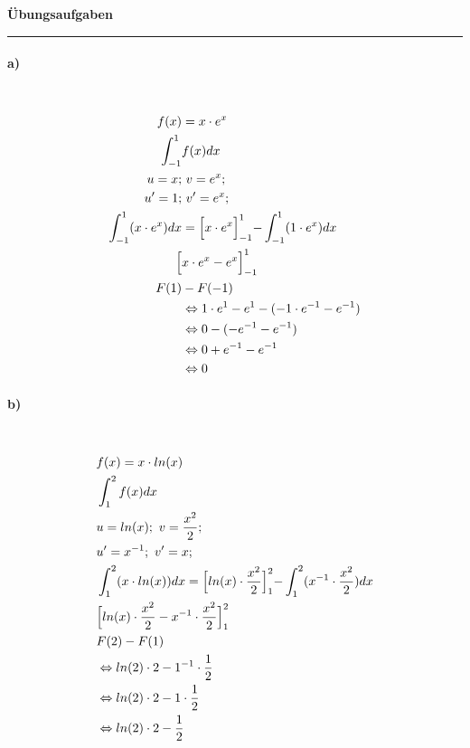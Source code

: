 \documentclass[12pt,a4paper]{report}
\begin{document}
	\noindent
	\Large
	\textbf{Übungsaufgaben}
	\hrule
	\vspace{0.2cm}

	\paragraph{a)} \mbox{} \\
	\begin{align*}
		f(x) &= x \cdot e^x \\
		\int_{-1}^{1}& f(x) dx \\
		u = x;&\ v = e^x; \\
		u' = 1;&\ v' = e^x; \\
		\int_{-1}^{1} (x \cdot e^x) dx &= \Bigl[x \cdot e^x\Bigl]^{1}_{-1}-\int_{-1}^{1} (1 \cdot e^x)dx \\
		\Bigl[&x \cdot e^x - e^x\Bigl]^{1}_{-1} \\
		F(1) &-F(-1) \\
		&\Leftrightarrow 1 \cdot e^1 - e^1 - (-1 \cdot e^{-1} - e^{-1}) \\
		&\Leftrightarrow 0 - (-e^{-1} - e^{-1}) \\
		&\Leftrightarrow 0 + e^{-1} - e^{-1} \\
		&\Leftrightarrow 0
	\end{align*}
	\paragraph{b)} \mbox{} \\
	\begin{align*}
		&f(x) = x \cdot ln(x) \\
		&\int_{1}^{2} f(x)dx \\
		&u=ln(x);\ v=\frac{x^2}{2}; \\
		&u'=x^{-1};\ v'=x; \\
		&\int_{1}^2 (x \cdot ln(x)) dx= \Bigl[ln(x) \cdot \frac{x^2}{2}\Bigl]^{2}_{1} - \int_{1}^{2} (x^{-1} \cdot \frac{x^2}{2}) dx \\
		&\Bigl[ln(x) \cdot \frac{x^2}{2} - x^{-1} \cdot \frac{x^2}{2}\Bigl]^{2}_1 \\
		&F(2) - F(1) \\
		&\Leftrightarrow ln(2) \cdot 2 - 1^{-1} \cdot \frac{1}{2} \\
		&\Leftrightarrow ln(2) \cdot 2 - 1 \cdot \frac{1}{2}  \\
		&\Leftrightarrow ln(2) \cdot 2 - \frac{1}{2}  
	\end{align*}
\end{document}
